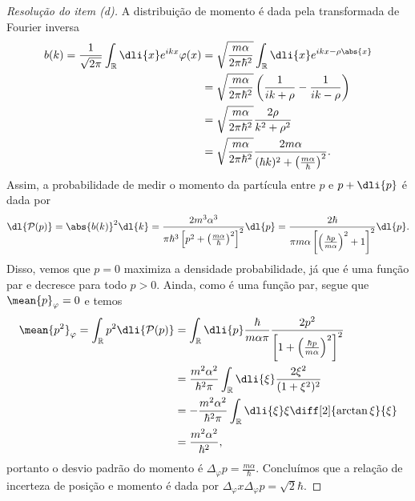 \begin{proof}[Resolução do item (d)]
    A distribuição de momento é dada pela transformada de Fourier inversa
    \begin{align*}
        b(k) = \frac{1}{\sqrt{2\pi}} \int_{\mathbb{R}} \dli{x} e^{i k x} \varphi(x)
        &= \sqrt{\frac{m \alpha}{2\pi \hbar^2}}\int_{\mathbb{R}} \dli{x} e^{ikx - \rho\abs{x}}\\
        &= \sqrt{\frac{m \alpha}{2\pi \hbar^2}} \left(\frac{1}{ik + \rho} - \frac{1}{ik - \rho}\right)\\
        &= \sqrt{\frac{m \alpha}{2\pi \hbar^2}}\frac{2\rho}{k^2 + \rho^2}\\
        &= \sqrt{\frac{m \alpha}{2\pi \hbar^2}} \frac{2m \alpha}{(\hbar k)^2 + \left(\frac{m \alpha}{\hbar}\right)^2}.
    \end{align*}
    Assim, a probabilidade de medir o momento da partícula entre \(p\) e \(p + \dli{p}\) é dada por
    \begin{equation*}
        \dl{\mathcal{P}(p)} = \abs{b(k)}^2\dl{k} = \frac{2m^3 \alpha^3}{\pi \hbar^3\left[p^2 + \left(\frac{m \alpha}{\hbar}\right)^2\right]^2} \dl{p} = \frac{2 \hbar}{\pi m \alpha \left[\left(\frac{\hbar p}{m \alpha}\right)^2 + 1\right]^2}\dl{p}.
    \end{equation*}
    Disso, vemos que \(p = 0\) maximiza a densidade probabilidade, já que é uma função par e decresce para todo \(p > 0\). Ainda, como é uma função par, segue que \(\mean{p}_{\varphi} = 0\) e temos
    \begin{align*}
        \mean{p^2}_{\varphi} = \int_{\mathbb{R}} p^2 \dli{\mathcal{P}(p)}
        &= \int_{\mathbb{R}} \dli{p} \frac{\hbar}{m \alpha \pi} \frac{2p^2}{\left[1 + \left(\frac{\hbar p}{m \alpha}\right)^2\right]^2}\\
        &= \frac{m^2 \alpha^2}{\hbar^2\pi} \int_{\mathbb{R}} \dli{\xi} \frac{2\xi^2}{(1 + \xi^2)^2}\\
        &= -\frac{m^2 \alpha^2}{\hbar^2 \pi} \int_{\mathbb{R}} \dli{\xi}\xi \diff[2]{\arctan\xi}{\xi}\\
        &= \frac{m^2 \alpha^2}{\hbar^2},
    \end{align*}
    portanto o desvio padrão do momento é \(\Delta_\varphi p = \frac{m \alpha}{\hbar}\). Concluímos que a relação de incerteza de posição e momento é dada por \(\Delta_\varphi x \Delta_\varphi p = \sqrt{2}\hbar\).
\end{proof}


